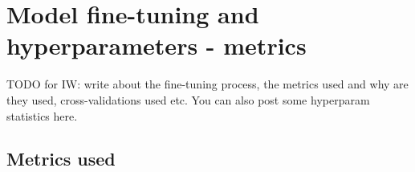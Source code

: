 
\section{Model fine-tuning and hyperparameters - metrics}

TODO for IW: write about the fine-tuning process, the metrics used and why are they used, cross-validations used etc. You can also post some hyperparam statistics here.

\subsection{Metrics used}